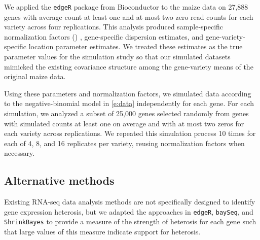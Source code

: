 \documentclass[useAMS,usenatbib,referee]{biom}
\newcommand{\edgeR}{{\tt edgeR}}
\newcommand{\ShrinkBayes}{{\tt ShrinkBayes}}
\begin{document}
We applied the \edgeR{} package \citep{robinson2010edgeR} from Bioconductor \citep{gentleman2004bioconductor} to the maize data on 27,888 genes with average count at least one and at most two zero read counts for each variety across four replications.  This analysis produced  sample-specific normalization factors () %
, gene-specific dispersion estimates, and gene-variety-specific location parameter estimates. We treated these estimates as the true parameter values for the simulation study so that our simulated datasets mimicked the existing covariance structure among the gene-variety means of the original maize data.

Using these parameters and normalization factors, we simulated data according to the negative-binomial model in \eqref{e:data} independently for each gene. For each simulation, we analyzed a subset of 25,000 genes selected randomly from genes with simulated counts at least one on average and with at most two zeros for each variety across replications.  We repeated this simulation process 10 times for each of 4, 8, and 16 replicates per variety, reusing normalization factors when necessary.  

\subsection{Alternative methods}
\label{s:alternative}

Existing RNA-seq data analysis methods are not specifically designed to identify gene expression heterosis, but we adapted the approaches in \edgeR{}, {\tt baySeq}, and \ShrinkBayes{} to provide a measure of the strength of heterosis for each gene such that large values of this measure indicate support for heterosis.
\end{document}

